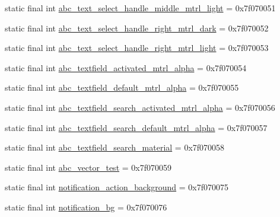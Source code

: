 \begin{DoxyCompactItemize}
\item 
static final int \mbox{\hyperlink{classcom_1_1synnapps_1_1carouselview_1_1_r_1_1drawable_a3238c8aace269358b4d5669270598344}{abc\+\_\+text\+\_\+select\+\_\+handle\+\_\+middle\+\_\+mtrl\+\_\+light}} = 0x7f070051
\item 
static final int \mbox{\hyperlink{classcom_1_1synnapps_1_1carouselview_1_1_r_1_1drawable_a0e1dd7d00307482853b3b3d4b368cbea}{abc\+\_\+text\+\_\+select\+\_\+handle\+\_\+right\+\_\+mtrl\+\_\+dark}} = 0x7f070052
\item 
static final int \mbox{\hyperlink{classcom_1_1synnapps_1_1carouselview_1_1_r_1_1drawable_a9395319a021bc8ea7a55903417c29950}{abc\+\_\+text\+\_\+select\+\_\+handle\+\_\+right\+\_\+mtrl\+\_\+light}} = 0x7f070053
\item 
static final int \mbox{\hyperlink{classcom_1_1synnapps_1_1carouselview_1_1_r_1_1drawable_ae5b8ca5e3d296c484f78e0928fd0c802}{abc\+\_\+textfield\+\_\+activated\+\_\+mtrl\+\_\+alpha}} = 0x7f070054
\item 
static final int \mbox{\hyperlink{classcom_1_1synnapps_1_1carouselview_1_1_r_1_1drawable_a04811e9f4ed6213e3fc7566fb9d28d44}{abc\+\_\+textfield\+\_\+default\+\_\+mtrl\+\_\+alpha}} = 0x7f070055
\item 
static final int \mbox{\hyperlink{classcom_1_1synnapps_1_1carouselview_1_1_r_1_1drawable_a51e9a390f969d58dc822a3a6497794ee}{abc\+\_\+textfield\+\_\+search\+\_\+activated\+\_\+mtrl\+\_\+alpha}} = 0x7f070056
\item 
static final int \mbox{\hyperlink{classcom_1_1synnapps_1_1carouselview_1_1_r_1_1drawable_aa735818134d731e5d0e0b5b7431ed841}{abc\+\_\+textfield\+\_\+search\+\_\+default\+\_\+mtrl\+\_\+alpha}} = 0x7f070057
\item 
static final int \mbox{\hyperlink{classcom_1_1synnapps_1_1carouselview_1_1_r_1_1drawable_a22d099392e5eb789695be2c9176891ae}{abc\+\_\+textfield\+\_\+search\+\_\+material}} = 0x7f070058
\item 
static final int \mbox{\hyperlink{classcom_1_1synnapps_1_1carouselview_1_1_r_1_1drawable_a74b30a0c41818011fb293f00c33d71d4}{abc\+\_\+vector\+\_\+test}} = 0x7f070059
\item 
static final int \mbox{\hyperlink{classcom_1_1synnapps_1_1carouselview_1_1_r_1_1drawable_aadd973bad547cc66d88b1f0e802ff8ce}{notification\+\_\+action\+\_\+background}} = 0x7f070075
\item 
static final int \mbox{\hyperlink{classcom_1_1synnapps_1_1carouselview_1_1_r_1_1drawable_aca617795dd7294dd36b32d6d46896764}{notification\+\_\+bg}} = 0x7f070076

\end{DoxyCompactItemize}
